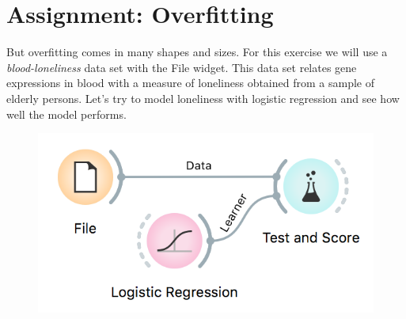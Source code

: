 \chapter{Assignment: Overfitting}
\label{hw:overfitting}

 But overfitting comes in many shapes and sizes. For this exercise we will use a \emph{blood-loneliness} data set with the File widget. This data set relates gene expressions in blood with a measure of loneliness obtained from a sample of elderly persons. Let's try to model loneliness with logistic regression and see how well the model performs.


\begin{figure}[h]
  \centering
  \includegraphics[scale=0.7]{overfitting1.png}%
  \caption{$\;$}
  \label{fig:wf1}
\end{figure}

